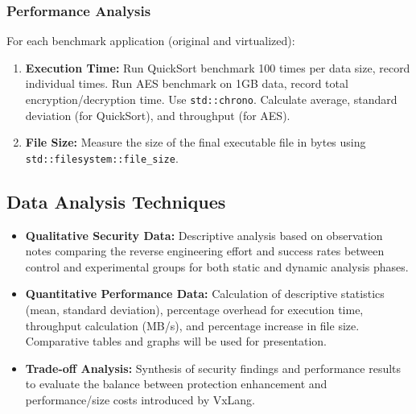 \subsubsection{Performance Analysis}
For each benchmark application (original and virtualized):
    \begin{enumerate}
        \item \textbf{Execution Time:} Run QuickSort benchmark 100 times per data size, record individual times. Run AES benchmark on 1GB data, record total encryption/decryption time. Use \texttt{std::chrono}. Calculate average, standard deviation (for QuickSort), and throughput (for AES).
        \item \textbf{File Size:} Measure the size of the final executable file in bytes using \texttt{std::filesystem::file\_size}.
    \end{enumerate}

\subsection{Data Analysis Techniques}
\begin{itemize}
    \item \textbf{Qualitative Security Data:} Descriptive analysis based on observation notes comparing the reverse engineering effort and success rates between control and experimental groups for both static and dynamic analysis phases.
    \item \textbf{Quantitative Performance Data:} Calculation of descriptive statistics (mean, standard deviation), percentage overhead for execution time, throughput calculation (MB/s), and percentage increase in file size. Comparative tables and graphs will be used for presentation.
    \item \textbf{Trade-off Analysis:} Synthesis of security findings and performance results to evaluate the balance between protection enhancement and performance/size costs introduced by VxLang.
\end{itemize}

